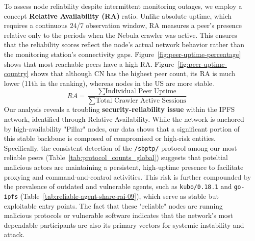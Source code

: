 \documentclass[10pt,a4paper,twocolumn]{article}
\begin{document}
To assess node reliability despite intermittent monitoring outages, we employ a concept \textbf{Relative Availability (RA)} ratio. Unlike absolute uptime, which requires a continuous 24/7 observation window, RA measures a peer's presence relative only to the periods when the Nebula crawler was active. This ensures that the reliability scores reflect the node's actual network behavior rather than the monitoring station's connectivity gaps.
Figure~\ref{fig:peer-uptime-percentage} shows that most reachable peers have a high RA. 
Figure~\ref{fig:peer-uptime-country} shows that although CN has the highest peer count, its RA is much lower (11th in the ranking), whereas nodes in the US are more stable.
$$RA = \frac{\sum \text{Individual Peer Uptime}}{\sum \text{Total Crawler Active Sessions}}$$
Our analysis reveals a troubling \textbf{security-reliability issue} within the IPFS network, identified through Relative Availability. While the network is anchored by high-availability "Pillar" nodes, our data shows that a significant portion of this stable backbone is composed of compromised or high-risk entities. 
Specifically, the consistent detection of the \texttt{/sbptp/} protocol among our most reliable peers (Table~\ref{tab:protocol_counts_global}) suggests that poteltial malicious actors are maintaining a persistent, high-uptime presence to facilitate proxying and command-and-control activities. This risk is further compounded by the prevalence of outdated and vulnerable agents, such as \texttt{kubo/0.18.1} and \texttt{go-ipfs} (Table~\ref{tab:reliable-agent-share-rai-09}), which serve as stable but exploitable entry points. The fact that these "reliable" nodes are running malicious protocols or vulnerable software indicates that the network's most dependable participants are also its primary vectors for systemic instability and attack.
\end{document}
